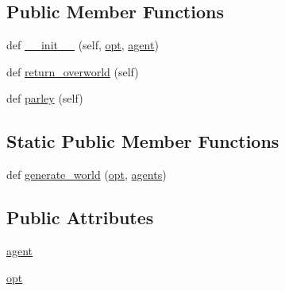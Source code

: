 \subsection*{Public Member Functions}
\begin{DoxyCompactItemize}
\item 
def \hyperlink{classparlai_1_1messenger_1_1core_1_1worlds_1_1SimpleMessengerOverworld_a38fc6d6a7e91c423296835d22b17f698}{\+\_\+\+\_\+init\+\_\+\+\_\+} (self, \hyperlink{classparlai_1_1messenger_1_1core_1_1worlds_1_1SimpleMessengerOverworld_ae368df3021f5138ada1cc529bdce5081}{opt}, \hyperlink{classparlai_1_1messenger_1_1core_1_1worlds_1_1SimpleMessengerOverworld_a472033ed4692a277fe07babce008f6d1}{agent})
\item 
def \hyperlink{classparlai_1_1messenger_1_1core_1_1worlds_1_1SimpleMessengerOverworld_a1473358d76ddda93da693d4eb51533fa}{return\+\_\+overworld} (self)
\item 
def \hyperlink{classparlai_1_1messenger_1_1core_1_1worlds_1_1SimpleMessengerOverworld_a738d11c40f8c1b171cc879bcd3a59e0f}{parley} (self)
\end{DoxyCompactItemize}
\subsection*{Static Public Member Functions}
\begin{DoxyCompactItemize}
\item 
def \hyperlink{classparlai_1_1messenger_1_1core_1_1worlds_1_1SimpleMessengerOverworld_a5e8145498aae6f5e41f8c3baf7b29b42}{generate\+\_\+world} (\hyperlink{classparlai_1_1messenger_1_1core_1_1worlds_1_1SimpleMessengerOverworld_ae368df3021f5138ada1cc529bdce5081}{opt}, \hyperlink{classparlai_1_1core_1_1worlds_1_1World_a728f75194cc26ea4035047c46cf62608}{agents})
\end{DoxyCompactItemize}
\subsection*{Public Attributes}
\begin{DoxyCompactItemize}
\item 
\hyperlink{classparlai_1_1messenger_1_1core_1_1worlds_1_1SimpleMessengerOverworld_a472033ed4692a277fe07babce008f6d1}{agent}
\item 
\hyperlink{classparlai_1_1messenger_1_1core_1_1worlds_1_1SimpleMessengerOverworld_ae368df3021f5138ada1cc529bdce5081}{opt}
\end{DoxyCompactItemize}


